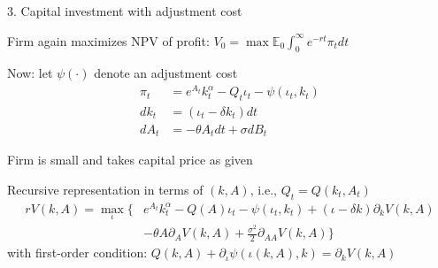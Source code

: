 \documentclass[11pt, aspectratio=169]{beamer}
\newenvironment{witemize}{\itemize\addtolength{\itemsep}{10pt}}{\enditemize}
\begin{document}
\begin{frame}{3. Capital investment with adjustment cost}

{\small
\begin{witemize}
\item Firm again maximizes NPV of profit: $V_0 = \max \mathbb{E}_0 \int_0^\infty e^{- r t} \pi_t dt$

\item Now: let $\psi(\cdot)$ denote an adjustment cost
\begin{align*}
	\pi_t &= e^{A_t} k_t^\alpha - Q_t \iota_t - \psi(\iota_t, k_t) \\
	d k_t &= (\iota_t - \delta k_t) dt \\
	d A_t &= - \theta A_t dt + \sigma dB_t
\end{align*}

\item Firm is small and takes capital price as given 

\item Recursive representation in terms of $(k, A)$, i.e., $Q_t = Q(k_t, A_t)$
\begin{align*}
	r V(k, A) = \max_\iota \Big\{ &e^{A_t} k_t^\alpha - Q(A) \iota_t - \psi(\iota_t, k_t) + (\iota - \delta k) \partial_k V(k, A) \\
	& - \theta A \partial_A V(k, A) + \frac{\sigma^2}{2} \partial_{AA} V(k, A) \Big\}
\end{align*}
with first-order condition: $Q(k, A) + \partial_\iota \psi(\iota(k, A), k) = \partial_k V(k, A)$
\end{witemize}
}
\end{frame}
\end{document}
